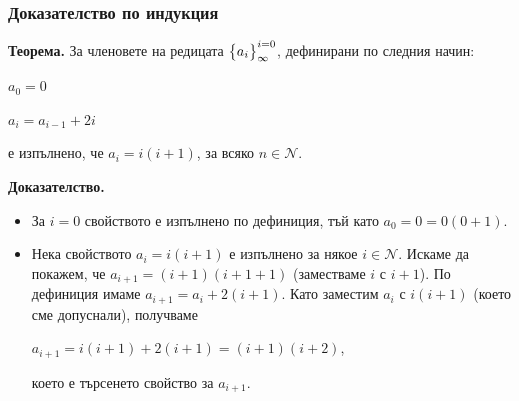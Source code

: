 \documentclass{beamer}
\begin{document}
\begin{frame}[fragile]
\frametitle{Доказателство по индукция}

\begin{flushleft}
\textbf{Теорема.} За членовете на редицата $\big{\{}a_i\big{\}}_\infty^{i=0}$, дефинирани по следния начин:

\vspace{10px}
$a_0 = 0$

$a_i = a_{i-1} + 2i$
\vspace{10px}

е изпълнено, че $a_i=i(i+1)$, за всяко $n \in \mathcal{N}$.

\vspace{10px}


\textbf{Доказателство.}

\begin{itemize}
  \item За $i=0$ свойството е изпълнено по дефиниция, тъй като $a_0=0=0(0+1)$.
  \item Нека свойството $a_i=i(i+1)$ е изпълнено за някое $i \in \mathcal{N}$. Искаме да покажем, че $a_{i+1}=(i+1)(i+1+1)$ (заместваме $i$ с $i+1$). По дефиниция имаме $a_{i+1} = a_i + 2(i+1)$. Като заместим $a_i$ с $i(i+1)$ (което сме допуснали), получваме

  $a_{i+1} = i(i+1) + 2(i+1) = (i+1)(i+2) $,

  което е търсенето свойство за $a_{i+1}$.
\end{itemize}

\end{flushleft}


\end{frame}
\end{document}

